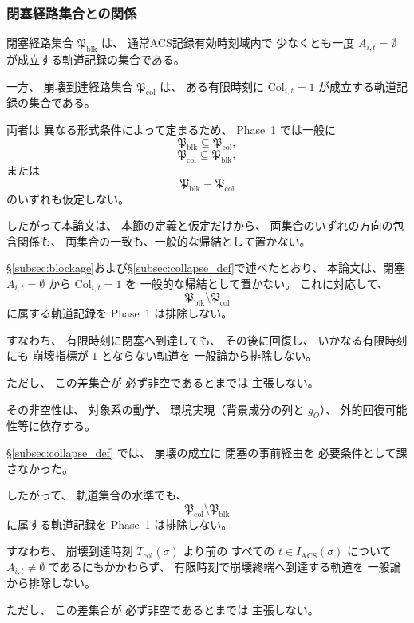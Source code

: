 \subsubsection{閉塞経路集合との関係}

\begin{remark}[閉塞経路集合と崩壊到達経路集合は一般に別対象である]
\label{rem:col_vs_blk}
閉塞経路集合
$\mathfrak{P}_{\mathrm{blk}}$
は、
通常ACS記録有効時刻域内で
少なくとも一度
$A_{i,t}=\emptyset$
が成立する軌道記録の集合である。

一方、
崩壊到達経路集合
$\mathfrak{P}_{\mathrm{col}}$
は、
ある有限時刻に
$\mathrm{Col}_{i,t}=1$
が成立する軌道記録の集合である。

両者は
異なる形式条件によって定まるため、
Phase~1 では一般に
\[
  \mathfrak{P}_{\mathrm{blk}}
  \subseteq
  \mathfrak{P}_{\mathrm{col}},
\]
\[
  \mathfrak{P}_{\mathrm{col}}
  \subseteq
  \mathfrak{P}_{\mathrm{blk}},
\]
または
\[
  \mathfrak{P}_{\mathrm{blk}}
  =
  \mathfrak{P}_{\mathrm{col}}
\]
のいずれも仮定しない。

したがって本論文は、
本節の定義と仮定だけから、
両集合のいずれの方向の包含関係も、
両集合の一致も、一般的な帰結として置かない。
\end{remark}

\begin{remark}[閉塞しても崩壊しない軌道を許容する]
\label{rem:blk_without_collapse_path}
\S\ref{subsec:blockage}および\S\ref{subsec:collapse_def}で述べたとおり、
本論文は、閉塞 $A_{i,t}=\emptyset$ から $\mathrm{Col}_{i,t}=1$ を
一般的な帰結として置かない。
これに対応して、
\[
  \mathfrak{P}_{\mathrm{blk}}
  \setminus
  \mathfrak{P}_{\mathrm{col}}
\]
に属する軌道記録を
Phase~1 は排除しない。

すなわち、
有限時刻に閉塞へ到達しても、
その後に回復し、
いかなる有限時刻にも
崩壊指標が $1$ とならない軌道を
一般論から排除しない。

ただし、
この差集合が
必ず非空であるとまでは
主張しない。

その非空性は、
対象系の動学、
環境実現（背景成分の列と $g_O$）、
外的回復可能性等に依存する。
\end{remark}

\begin{remark}[閉塞を経由せず崩壊する軌道を許容する]
\label{rem:col_without_blk_path}
\S\ref{subsec:collapse_def} では、
崩壊の成立に
閉塞の事前経由を
必要条件として課さなかった。

したがって、
軌道集合の水準でも、
\[
  \mathfrak{P}_{\mathrm{col}}
  \setminus
  \mathfrak{P}_{\mathrm{blk}}
\]
に属する軌道記録を
Phase~1 は排除しない。

すなわち、
崩壊到達時刻
$T_{\mathrm{col}}(\sigma)$
より前の
すべての
$t\in I_{\mathrm{ACS}}(\sigma)$
について
$A_{i,t}\neq\emptyset$
であるにもかかわらず、
有限時刻で崩壊終端へ到達する軌道を
一般論から排除しない。

ただし、
この差集合が
必ず非空であるとまでは
主張しない。
\end{remark}

